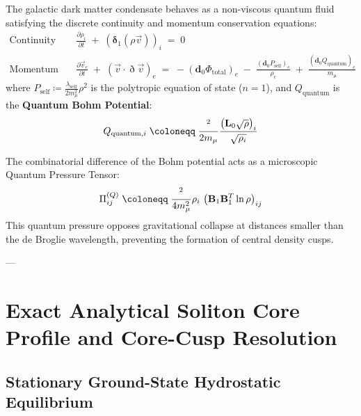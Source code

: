 \documentclass[
    12pt,
    a4paper,
    headings=normal,
    twoside=false,
    open=any,
    parskip=half
]{scrbook}
\let\hbar\relax
\newcommand{\ethop}{\eth}
\begin{document}
\begin{phystheorem}\label{thm:ch11_madelung_hydrodynamic_system}
The galactic dark matter condensate behaves as a non-viscous quantum fluid satisfying the discrete continuity and momentum conservation equations:
\begin{align}
\text{Continuity Equation:} \quad &\frac{\partial \rho_i}{\partial t} \;+\; \left( \boldsymbol{\delta}_1 \left( \rho \vec{v} \right) \right)_i \;=\; 0 \label{eq:ch11_madelung_continuity} \\
\text{Momentum Equation:} \quad &\frac{\partial \vec{v}_e}{\partial t} \;+\; \left( \vec{v} \cdot \ethop \vec{v} \right)_e \;=\; -\left( \mathbf{d}_0 \Phi_{\text{total}} \right)_e \;-\; \frac{\left( \mathbf{d}_0 P_{\text{self}} \right)_e}{\rho_e} \;+\; \frac{\left( \mathbf{d}_0 Q_{\text{quantum}} \right)_e}{m_\mu} \label{eq:ch11_madelung_momentum}
\end{align}
where $P_{\text{self}} \coloneqq \frac{\lambda_{\text{self}}}{2m_\mu^2} \rho^2$ is the polytropic equation of state ($n = 1$), and $Q_{\text{quantum}}$ is the \textbf{Quantum Bohm Potential}:
\begin{equation}
Q_{\text{quantum}, i} \;\coloneqq\; \frac{\hbar^2}{2m_\mu} \frac{\left( \mathbf{L}_0 \sqrt{\rho} \right)_i}{\sqrt{\rho_i}}
\label{eq:ch11_quantum_bohm_potential_def}
\end{equation}
\end{phystheorem}

The combinatorial difference of the Bohm potential acts as a microscopic Quantum Pressure Tensor:
\begin{equation}
\Pi_{ij}^{(Q)} \;\coloneqq\; \frac{\hbar^2}{4 m_\mu^2} \rho_i \, \left( \mathbf{B}_1 \mathbf{B}_1^T \ln \rho \right)_{ij}
\label{eq:ch11_quantum_pressure_tensor}
\end{equation}
This quantum pressure opposes gravitational collapse at distances smaller than the de Broglie wavelength, preventing the formation of central density cusps.

---

\section{Exact Analytical Soliton Core Profile and Core-Cusp Resolution}
\label{sec:ch11_soliton_core_profile_derivation}

\subsection{Stationary Ground-State Hydrostatic Equilibrium}
\end{document}
